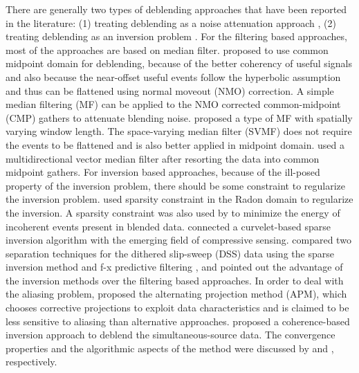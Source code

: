 There are generally two types of deblending approaches that have been reported in the literature: (1) treating deblending as a noise attenuation approach \cite[]{mediandeblend,yangkang2014,yangkang2014nmo,yangkang2014svmf,yangkang2014simi,yangkang2015ortho}, (2) treating deblending as an inversion problem \cite[]{sep,abma2010,yangkang20142,shuwei2015seg}.  For the filtering based approaches, most of the approaches are based on median filter. \cite{yangkang2014nmo} proposed to use common midpoint domain for deblending, because of the better coherency of useful signals and also because the near-offset useful events follow the hyperbolic assumption and thus can be flattened using normal moveout (NMO) correction. A simple median filtering (MF) can be applied to the NMO corrected common-midpoint (CMP) gathers to attenuate blending noise. \cite{yangkang2014svmf} proposed a type of MF with spatially varying window length. The space-varying median filter (SVMF) does not require the events to be flattened and is also better applied in midpoint domain. \cite{mediandeblend} used a multidirectional vector median filter  after resorting the data into common midpoint gathers. For inversion based approaches, because of the ill-posed property of the inversion problem, there should be some constraint to regularize the inversion problem. \cite{akerberg2008} used sparsity constraint in the Radon domain to regularize the inversion. A sparsity constraint was also used by \cite{abma2010} to minimize the energy of incoherent events present in blended data. \cite{lin2009} connected a curvelet-based sparse inversion algorithm with the emerging field of compressive sensing. \cite{bagaini2012} compared two separation techniques for the dithered slip-sweep (DSS) data using the sparse inversion method  and f-x predictive filtering \cite[]{canales1984}, and pointed out the advantage of the inversion methods over the filtering based approaches. In order to deal with the aliasing problem, \cite{proj} proposed the alternating projection method (APM), which chooses corrective projections to exploit data characteristics and is claimed to be less sensitive to aliasing than alternative approaches. \cite{mahdad2010} proposed a coherence-based inversion approach to deblend the simultaneous-source data. The convergence properties and the algorithmic aspects of the method were discussed by \cite{panagiotis20122} and \cite{araz2012}, respectively. 

